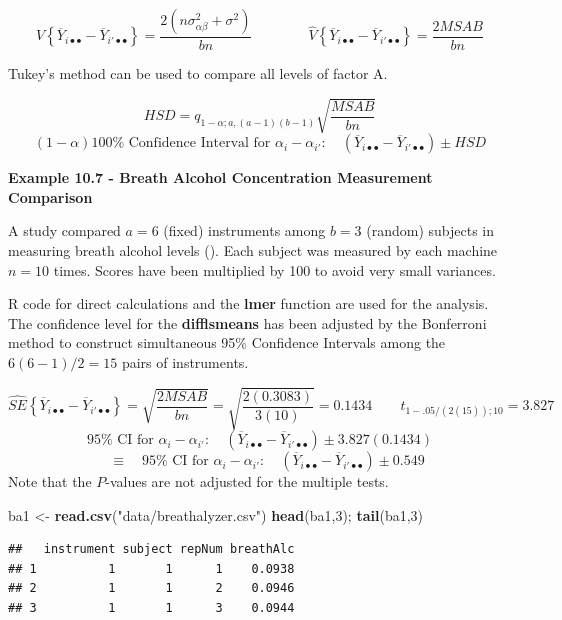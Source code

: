 \documentclass[
]{book}
\newenvironment{Shaded}{\begin{snugshade}}{\end{snugshade}}
\newcommand{\DecValTok}[1]{\textcolor[rgb]{0.00,0.00,0.81}{#1}}
\newcommand{\FunctionTok}[1]{\textcolor[rgb]{0.13,0.29,0.53}{\textbf{#1}}}
\newcommand{\NormalTok}[1]{#1}
\newcommand{\OtherTok}[1]{\textcolor[rgb]{0.56,0.35,0.01}{#1}}
\newcommand{\StringTok}[1]{\textcolor[rgb]{0.31,0.60,0.02}{#1}}
\begin{document}
\[
V\left\{\overline{Y}_{i\bullet\bullet} - \overline{Y}_{i'\bullet\bullet}\right\}=
\frac{2\left(n\sigma_{\alpha\beta}^2 + \sigma^2\right)}{bn}  \qquad \qquad
\hat{V}\left\{\overline{Y}_{i\bullet\bullet} - \overline{Y}_{i'\bullet\bullet}\right\}=
\frac{2MSAB}{bn}
\]

Tukey's method can be used to compare all levels of factor A.

\[
HSD = q_{1-\alpha;a,(a-1)(b-1)}\sqrt{\frac{MSAB}{bn}}
\] \[
(1-\alpha)100\% \mbox{ Confidence Interval for } \alpha_i-\alpha_{i'}: \quad
\left(\overline{Y}_{i\bullet\bullet}-\overline{Y}_{i'\bullet\bullet}\right) \pm HSD
\]

\textbf{Example 10.7 - Breath Alcohol Concentration Measurement
Comparison}

A study compared \(a=6\) (fixed) instruments among \(b=3\) (random)
subjects in measuring breath alcohol levels
(). Each subject was measured
by each machine \(n=10\) times. Scores have been multiplied by 100 to
avoid very small variances.

R code for direct calculations and the \textbf{lmer} function are used
for the analysis. The confidence level for the \textbf{difflsmeans} has
been adjusted by the Bonferroni method to construct simultaneous 95\%
Confidence Intervals among the \(6(6-1)/2=15\) pairs of instruments.

\[
\hat{SE}\left\{\overline{Y}_{i\bullet\bullet}-\overline{Y}_{i'\bullet\bullet}\right\}=
\sqrt{\frac{2MSAB}{bn}}=\sqrt{\frac{2(0.3083)}{3(10)}}=0.1434
\qquad t_{1-.05/(2(15));10} = 3.827
\] \[
95\% \mbox{ CI for } \alpha_i-\alpha_{i'}: \quad
\left(\overline{Y}_{i\bullet\bullet}-\overline{Y}_{i'\bullet\bullet}\right)
\pm 3.827(0.1434) 
\] \[
\quad \equiv \quad
95\% \mbox{ CI for } \alpha_i-\alpha_{i'}: \quad
\left(\overline{Y}_{i\bullet\bullet}-\overline{Y}_{i'\bullet\bullet}\right)
\pm 0.549
\] Note that the \(P\)-values are not adjusted for the multiple tests.

\begin{Shaded}
\begin{Highlighting}[]
\NormalTok{ba1 }\OtherTok{\textless{}{-}} \FunctionTok{read.csv}\NormalTok{(}\StringTok{"data/breathalyzer.csv"}\NormalTok{)}
\FunctionTok{head}\NormalTok{(ba1,}\DecValTok{3}\NormalTok{); }\FunctionTok{tail}\NormalTok{(ba1,}\DecValTok{3}\NormalTok{)}
\end{Highlighting}
\end{Shaded}

\begin{verbatim}
##   instrument subject repNum breathAlc
## 1          1       1      1    0.0938
## 2          1       1      2    0.0946
## 3          1       1      3    0.0944
\end{verbatim}
\end{document}
